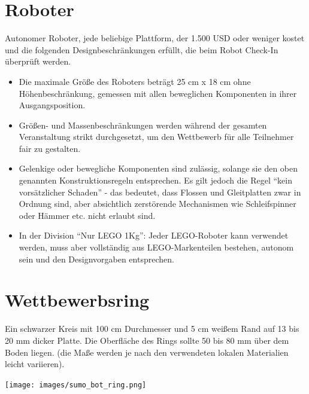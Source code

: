 \documentclass[a4paper,12pt]{article}
\begin{document}
\section{Roboter}
Autonomer Roboter, jede beliebige Plattform, der 1.500 USD oder weniger kostet
und die folgenden Designbeschränkungen erfüllt, die beim Robot Check-In
überprüft werden.
\begin{itemize}
	\item Die maximale Größe des Roboters beträgt 25 cm x 18 cm ohne
		Höhenbeschränkung, gemessen mit allen beweglichen Komponenten
		in ihrer Ausgangsposition.
	\item Größen- und Massenbeschränkungen werden während der gesamten
		Veranstaltung strikt durchgesetzt, um den Wettbewerb für alle
		Teilnehmer fair zu gestalten.
	\item Gelenkige oder bewegliche Komponenten sind zulässig, solange sie
		den oben genannten Konstruktionsregeln entsprechen. Es gilt
		jedoch die Regel "`kein vorsätzlicher Schaden"' - das bedeutet,
		dass Flossen und Gleitplatten zwar in Ordnung sind, aber
		absichtlich zerstörende Mechanismen wie Schleifspinner oder
		Hämmer etc. nicht erlaubt sind.
	\item In der Division "`Nur LEGO 1Kg"': Jeder LEGO-Roboter kann
		verwendet werden, muss aber vollständig aus LEGO-Markenteilen
		bestehen, autonom sein und den Designvorgaben entsprechen.
\end{itemize}

\section{Wettbewerbsring}
Ein schwarzer Kreis mit 100 cm Durchmesser und 5 cm weißem Rand auf 13 bis 20
mm dicker Platte. Die Oberfläche des Rings sollte 50 bis 80 mm über dem Boden
liegen. (die Maße werden je nach den verwendeten lokalen Materialien leicht
variieren).

\texttt{[image: images/sumo\_bot\_ring.png]}
\end{document}
